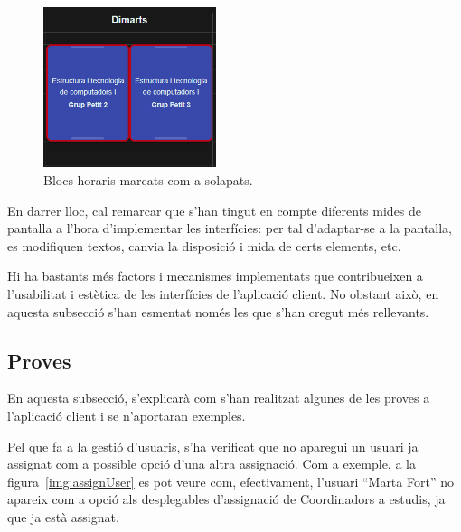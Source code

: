 \documentclass[a4paper,12pt]{ThesisStyle}
\begin{document}
\begin{figure}[H]
  \centering
  \includegraphics[width=0.45\textwidth]{assets/code/usabilitat/solapament.png}
  \caption{\label{img:impl_solapament} Blocs horaris marcats com a solapats.}
\end{figure}

\newpage

En darrer lloc, cal remarcar que s'han tingut en compte diferents mides de pantalla a l'hora d'implementar les interfícies: per tal d'adaptar-se a la pantalla, es modifiquen textos, canvia la disposició i mida de certs elements, etc.

Hi ha bastants més factors i mecanismes implementats que contribueixen a l'usabilitat i estètica de les interfícies de l'aplicació client. No obstant això, en aquesta subsecció s'han esmentat només les que s'han cregut més rellevants.

\subsection{Proves}
\label{subsec:proves_client}

En aquesta subsecció, s'explicarà com s'han realitzat algunes de les proves a l'aplicació client i se n'aportaran exemples.

Pel que fa a la gestió d'usuaris, s'ha verificat que no aparegui un usuari ja assignat com a possible opció d'una altra assignació. Com a exemple, a la figura~\ref{img:assignUser} es pot veure com, efectivament, l'usuari ``Marta Fort'' no apareix com a opció als desplegables d'assignació de Coordinadors a estudis, ja que ja està assignat.
\end{document}
